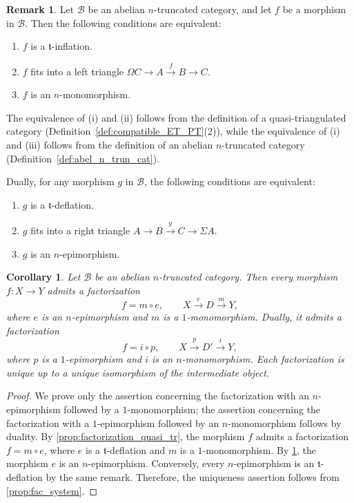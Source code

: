 \documentclass[a4paper,reqno,10pt]{amsart}
\newtheorem{corollary}[corollary]{Corollary}
\theoremstyle{definition}
\theoremstyle{definition}
\newtheorem{remark}[remark]{Remark}
\theoremstyle{definition}
\theoremstyle{definition}
\theoremstyle{plain}
\newcommand{\ft}{\mathfrak{t}}
\newcommand{\CB}{\mathcal{B}}
\begin{document}
\begin{remark}
\label{rem:defl_n_epi_reg_epi}
Let $\CB$ be an abelian $n$-truncated category, and let $f$ be a
morphism in $\CB$. Then the following conditions are equivalent:
\begin{enumerate}
    \item[(i)] $f$ is a $\ft$-inflation.
    \item[(ii)] $f$ fits into a left triangle $\Omega C\to A\xrightarrow{f}B\to C$.
    \item[(iii)] $f$ is an $n$-monomorphism.
\end{enumerate}
The equivalence of (i) and (ii) follows
from the definition of a quasi-triangulated category
(Definition~\ref{def:compatible_ET_PT}\textnormal{(2)}), while the
equivalence of (i) and (iii) follows from
the definition of an abelian $n$-truncated category
(Definition~\ref{def:abel_n_trun_cat}).

Dually, for any morphism $g$ in $\CB$, the following conditions are
equivalent:
\begin{enumerate}
    \item[(i)] $g$ is a $\ft$-deflation.
    \item[(ii)] $g$ fits into a right triangle $A\to B\xrightarrow{g}C\to\Sigma A$.
    \item[(iii)] $g$ is an $n$-epimorphism.
\end{enumerate}
\end{remark}

\color{blue}

\begin{corollary}
\label{cor:n_epi_1_mono_factorization}
Let $\CB$ be an abelian $n$-truncated category. Then every morphism
$f\colon X\to Y$ admits a factorization
\[
f=m\circ e,\qquad
X\xrightarrow{e}D\xrightarrow{m}Y,
\]
where $e$ is an $n$-epimorphism and $m$ is a $1$-monomorphism.
Dually, it admits a factorization
\[
f=i\circ p,\qquad
X\xrightarrow{p}D'\xrightarrow{i}Y,
\]
where $p$ is a $1$-epimorphism and $i$ is an $n$-monomorphism.
Each factorization is unique up to a unique isomorphism of the
intermediate object.
\end{corollary}

\begin{proof}
We prove only the assertion concerning the factorization with an $n$-epimorphism followed by a $1$-monomorphism; the assertion concerning the factorization with a $1$-epimorphism followed by an $n$-monomorphism follows by duality.
By \cref{prop:factorization_quasi_tr}, the morphism $f$ admits a
factorization $f=m\circ e$, where $e$ is a $\ft$-deflation and $m$
is a $1$-monomorphism. By \cref{rem:defl_n_epi_reg_epi}, the morphism
$e$ is an $n$-epimorphism. Conversely, every $n$-epimorphism is an
$\ft$-deflation by the same remark. Therefore, the uniqueness
assertion follows from \cref{prop:fac_system}.
\end{proof}
\end{document}
